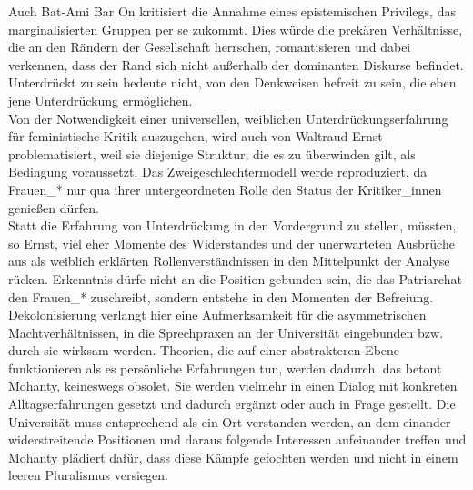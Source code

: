 Auch Bat-Ami Bar On kritisiert die Annahme eines epistemischen Privilegs, das
marginalisierten Gruppen per se zukommt. Dies würde die prekären Verhältnisse,
die an den Rändern der Gesellschaft herrschen, romantisieren und dabei
verkennen, dass der Rand sich nicht außerhalb der dominanten Diskurse befindet.
Unterdrückt zu sein bedeute nicht, von den Denkweisen befreit zu sein, die eben
jene Unterdrückung ermöglichen.\footnotemark {}\\

Von der Notwendigkeit einer universellen, weiblichen Unterdrückungserfahrung
für feministische Kritik auszugehen, wird auch von Waltraud Ernst
problematisiert, weil sie diejenige Struktur, die es zu überwinden gilt, als
Bedingung voraussetzt. Das Zweigeschlechtermodell werde reproduziert, da
Frauen\_* nur qua ihrer untergeordneten Rolle den Status der Kritiker\_innen
genießen dürfen. \\
Statt die Erfahrung von Unterdrückung in den Vordergrund zu
stellen, müssten, so Ernst, viel eher Momente des Widerstandes und der
unerwarteten Ausbrüche aus als weiblich erklärten Rollenverständnissen in den
Mittelpunkt der Analyse rücken. Erkenntnis dürfe nicht an die Position gebunden
sein, die das Patriarchat den Frauen\_* zuschreibt, sondern entstehe in den
Momenten der Befreiung.\footnotemark {}\\

\noindent Dekolonisierung verlangt hier eine
Aufmerksamkeit für die asymmetrischen Machtverhältnissen, in die Sprechpraxen
an der Universität eingebunden bzw. durch sie wirksam werden. Theorien, die auf
einer abstrakteren Ebene funktionieren als es persönliche Erfahrungen tun,
werden dadurch, das betont Mohanty, keineswegs obsolet. Sie werden vielmehr in
einen Dialog mit konkreten Alltagserfahrungen gesetzt und dadurch ergänzt oder
auch in Frage gestellt.\footnotemark {} Die Universität muss entsprechend als ein Ort verstanden
werden, an dem einander widerstreitende Positionen und daraus folgende
Interessen aufeinander treffen und Mohanty plädiert dafür, dass diese Kämpfe
gefochten werden und nicht in einem leeren Pluralismus versiegen.\\

